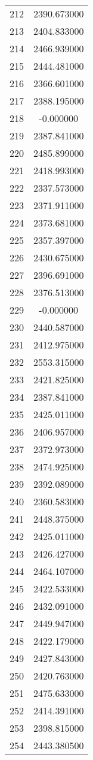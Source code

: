 \documentclass[12pt]{article}
\begin{document}
\begin{longtable}{@{}cc@{}}
212 & 2390.673000 \\
213 & 2404.833000 \\
214 & 2466.939000 \\
215 & 2444.481000 \\
216 & 2366.601000 \\
217 & 2388.195000 \\
218 & -0.000000 \\
219 & 2387.841000 \\
220 & 2485.899000 \\
221 & 2418.993000 \\
222 & 2337.573000 \\
223 & 2371.911000 \\
224 & 2373.681000 \\
225 & 2357.397000 \\
226 & 2430.675000 \\
227 & 2396.691000 \\
228 & 2376.513000 \\
229 & -0.000000 \\
230 & 2440.587000 \\
231 & 2412.975000 \\
232 & 2553.315000 \\
233 & 2421.825000 \\
234 & 2387.841000 \\
235 & 2425.011000 \\
236 & 2406.957000 \\
237 & 2372.973000 \\
238 & 2474.925000 \\
239 & 2392.089000 \\
240 & 2360.583000 \\
241 & 2448.375000 \\
242 & 2425.011000 \\
243 & 2426.427000 \\
244 & 2464.107000 \\
245 & 2422.533000 \\
246 & 2432.091000 \\
247 & 2449.947000 \\
248 & 2422.179000 \\
249 & 2427.843000 \\
250 & 2420.763000 \\
251 & 2475.633000 \\
252 & 2414.391000 \\
253 & 2398.815000 \\
254 & 2443.380500 \\

\end{longtable}
\end{document}
